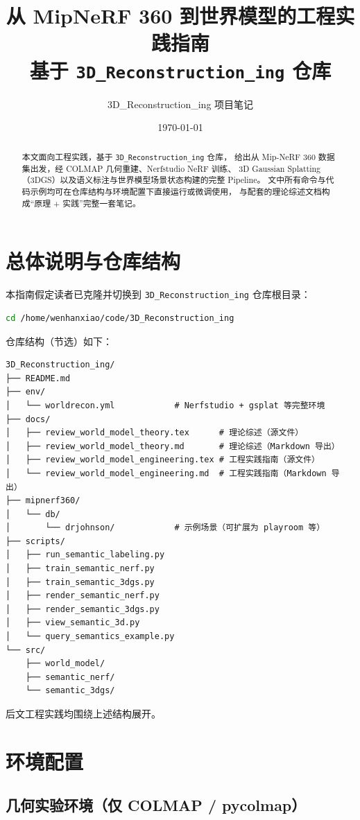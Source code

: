 \documentclass[12pt]{ctexart}
\title{从 Mip\text{-}NeRF 360 到世界模型的工程实践指南\\[4pt]\large 基于 \texttt{3D\_Reconstruction\_ing} 仓库}
\author{3D\_Reconstruction\_ing 项目笔记}
\date{\today}
\begin{document}
\maketitle

\begin{abstract}
本文面向工程实践，基于 \texttt{3D\_Reconstruction\_ing} 仓库，
给出从 Mip-NeRF 360 数据集出发，经 COLMAP 几何重建、Nerfstudio NeRF 训练、
3D Gaussian Splatting（3DGS）以及语义标注与世界模型场景状态构建的完整 Pipeline。
文中所有命令与代码示例均可在仓库结构与环境配置下直接运行或微调使用，
与配套的理论综述文档构成“原理 + 实践”完整一套笔记。
\end{abstract}

\tableofcontents

\section{总体说明与仓库结构}

本指南假定读者已克隆并切换到 \texttt{3D\_Reconstruction\_ing} 仓库根目录：
\begin{lstlisting}[language=bash]
cd /home/wenhanxiao/code/3D_Reconstruction_ing
\end{lstlisting}

仓库结构（节选）如下：
\begin{lstlisting}
3D_Reconstruction_ing/
├── README.md
├── env/
│   └── worldrecon.yml            # Nerfstudio + gsplat 等完整环境
├── docs/
│   ├── review_world_model_theory.tex      # 理论综述（源文件）
│   ├── review_world_model_theory.md       # 理论综述（Markdown 导出）
│   ├── review_world_model_engineering.tex # 工程实践指南（源文件）
│   └── review_world_model_engineering.md  # 工程实践指南（Markdown 导出）
├── mipnerf360/
│   └── db/
│       └── drjohnson/            # 示例场景（可扩展为 playroom 等）
├── scripts/
│   ├── run_semantic_labeling.py
│   ├── train_semantic_nerf.py
│   ├── train_semantic_3dgs.py
│   ├── render_semantic_nerf.py
│   ├── render_semantic_3dgs.py
│   ├── view_semantic_3d.py
│   └── query_semantics_example.py
└── src/
    ├── world_model/
    ├── semantic_nerf/
    └── semantic_3dgs/
\end{lstlisting}

后文工程实践均围绕上述结构展开。

\section{环境配置}

\subsection{几何实验环境（仅 COLMAP / pycolmap）}
\end{document}
